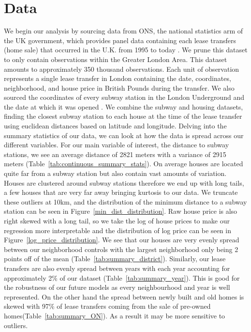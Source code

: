 \section{Data}
\label{sec:data}
We begin our analysis by sourcing data from ONS, the national statistics arm of the UK government,
 which provides panel data containing each lease transfers (home sale) that occurred in the U.K. from 1995 to today \citep{land_ukgov}.
  We prune this dataset to only contain observations within the Greater London Area.
   This dataset amounts to approximately 350 thousand observations. Each unit of observation represents
    a single lease transfer in London containing the date, coordinates, neighborhood, and house price in British Pounds during the transfer.
      We also sourced the coordinates of every subway station in the
      London Underground and the date at which it was opened \citep{subway_wikipedia}. 
We combine the subway and housing datasets, finding the closest subway station to each house at the time of the lease transfer using euclidean distances based on latitude and longitude.
Delving into the summary statistics of our data, we can look at how the data is spread
 across our different variables. For our main variable of interest, the distance to subway stations, we see an
  average distance of 2821 meters with a variance of 2915 meters (Table~\ref{tab:continuous_summary_stats}). On average houses are located quite far from
   a subway station but also contain vast amounts of variation. Houses are clustered around subway stations therefore we end up with long tails, a few houses that are very far away bringing kurtosis to our data.
    We truncate these outliers at 10km, and the distribution of the minimum distance to a subway station can be seen in Figure~\ref{min_dist_distribution}.
     Raw house price is also right skewed with a long tail, so we take the log of house prices to make our regression more interpretable
      and the distribution of log price can be seen in Figure~\ref{log_price_distribution}.
We see that our houses are very evenly spread between our neighborhood controls with the largest
 neighborhood only being 2 points off of the mean (Table~\ref{tab:summary_district}). Similarly, our lease transfers are also evenly spread between years
  with each year accounting for approximately 2\% 
  of our dataset (Table~\ref{tab:summary_year}). This is good for the robustness of our future models as every neighbourhood and year is well represented. 
  On the other hand the spread between newly built and old homes is skewed with 97\%
   of lease transfers coming from the sale of pre-owned homes(Table~\ref{tab:summary_ON}). As a result it may be more sensitive to outliers.
